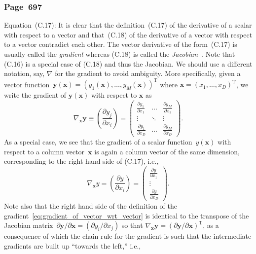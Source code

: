 \documentclass[12pt,a4paper]{article}
\newcommand{\erratum}[1]{%
\subsubsection*{#1}
\addcontentsline{toc}{subsection}{#1}}
\begin{document}
\erratum{Page~697}
Equation~(C.17):
It is clear that the definition~(C.17) of the derivative of a scalar with respect to a vector
and that~(C.18) of the derivative of a vector with respect to a vector contradict each other.
The vector derivative of the form~(C.17) is usually called the \emph{gradient}
whereas (C.18) is called the \emph{Jacobian}~\citep{Minka:OldNewMatrixAlgebra}.
Note that (C.16) is a special case of (C.18) and thus the Jacobian.
We should use a different notation, say, $\nabla$ for the gradient to avoid ambiguity.
More specifically, given a vector function~$\mathbf{y}(\mathbf{x}) =
\left(y_1(\mathbf{x}), \dots, y_M(\mathbf{x})\right)^{\operatorname{T}}$
where $\mathbf{x} = \left(x_1, \dots, x_D \right)^{\operatorname{T}}$,
we write the gradient of $\mathbf{y}(\mathbf{x})$ with respect to $\mathbf{x}$ as
\begin{equation}
\nabla_{\mathbf{x}} \mathbf{y} \equiv \left( \frac{\partial y_j}{\partial x_i} \right) =
\begin{pmatrix}
\frac{\partial y_1}{\partial x_1} & \hdots & \frac{\partial y_M}{\partial x_1} \\
\vdots & \ddots & \vdots \\
\frac{\partial y_1}{\partial x_D} & \hdots & \frac{\partial y_M}{\partial x_D}
\end{pmatrix} .
\label{eq:gradient_of_vector_wrt_vector}
\end{equation}
As a special case, we see that the gradient of a scalar function~$y(\mathbf{x})$ with respect to
a column vector~$\mathbf{x}$ is again a column vector of the same dimension,
corresponding to the right hand side of (C.17), i.e.,
\begin{equation}
\nabla_{\mathbf{x}} y = \left( \frac{\partial y}{\partial x_i} \right) =
\begin{pmatrix}
\frac{\partial y}{\partial x_1} \\
\vdots  \\
\frac{\partial y}{\partial x_D}
\end{pmatrix} .
\end{equation}
Note also that the right hand side of the definition of
the gradient~\eqref{eq:gradient_of_vector_wrt_vector} is identical to
the transpose of the Jacobian matrix~$\partial\mathbf{y}/\partial\mathbf{x} =
\left( \partial y_i/\partial x_j \right)$
so that $\nabla_{\mathbf{x}} \mathbf{y} =
\left( \partial\mathbf{y}/\partial\mathbf{x} \right)^{\operatorname{T}}$,
as a consequence of which the chain rule for the gradient is such that the intermediate gradients
are built up ``towards the left,'' i.e.,
\end{document}
